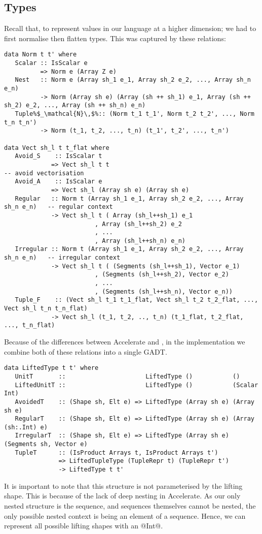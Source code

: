 \subsection{Types}
Recall that, to represent values in our language at a higher dimension; we had to first normalise then flatten types. This was captured by these relations:
%
\begin{lstlisting}[style=ndp]
data Norm t t' where
   Scalar :: IsScalar e
          => Norm e (Array Z e)
   Nest   :: Norm e (Array sh_1 e_1, Array sh_2 e_2, ..., Array sh_n e_n)
          -> Norm (Array sh e) (Array (sh ++ sh_1) e_1, Array (sh ++ sh_2) e_2, ..., Array (sh ++ sh_n) e_n)
   Tuple%$_\mathcal{N}\,$%:: (Norm t_1 t_1', Norm t_2 t_2', ..., Norm t_n t_n')
          -> Norm (t_1, t_2, ..., t_n) (t_1', t_2', ..., t_n')

data Vect sh_l t t_flat where
   Avoid_S    :: IsScalar t
             => Vect sh_l t t                                             -- avoid vectorisation
   Avoid_A    :: IsScalar e
             => Vect sh_l (Array sh e) (Array sh e)
   Regular   :: Norm t (Array sh_1 e_1, Array sh_2 e_2, ..., Array sh_n e_n)   -- regular context
             -> Vect sh_l t ( Array (sh_l++sh_1) e_1
                         , Array (sh_l++sh_2) e_2
                         , ...
                         , Array (sh_l++sh_n) e_n)
   Irregular :: Norm t (Array sh_1 e_1, Array sh_2 e_2, ..., Array sh_n e_n)   -- irregular context
             -> Vect sh_l t ( (Segments (sh_l++sh_1), Vector e_1)
                         , (Segments (sh_l++sh_2), Vector e_2)
                         , ...
                         , (Segments (sh_l++sh_n), Vector e_n))
   Tuple_F    :: (Vect sh_l t_1 t_1_flat, Vect sh_l t_2 t_2_flat, ..., Vect sh_l t_n t_n_flat)
             -> Vect sh_l (t_1, t_2, .., t_n) (t_1_flat, t_2_flat, ..., t_n_flat)
\end{lstlisting}
%
Because of the differences between Accelerate and \ndp{}, in the implementation we combine both of these relations into a single GADT.
%
\begin{lstlisting}
data LiftedType t t' where
   UnitT       ::                      LiftedType ()           ()
   LiftedUnitT ::                      LiftedType ()           (Scalar Int)
   AvoidedT    :: (Shape sh, Elt e) => LiftedType (Array sh e) (Array sh e)
   RegularT    :: (Shape sh, Elt e) => LiftedType (Array sh e) (Array (sh:.Int) e)
   IrregularT  :: (Shape sh, Elt e) => LiftedType (Array sh e) (Segments sh, Vector e)
   TupleT      :: (IsProduct Arrays t, IsProduct Arrays t')
               => LiftedTupleType (TupleRepr t) (TupleRepr t')
               -> LiftedType t t'
\end{lstlisting}
%
It is important to note that this structure is not parameterised by the lifting shape. This is because of the lack of deep nesting in Accelerate. As our only nested structure is the sequence, and sequences themselves cannot be nested, the only possible nested context is being an element of a sequence. Hence, we can represent all possible lifting shapes with an @Int@.

